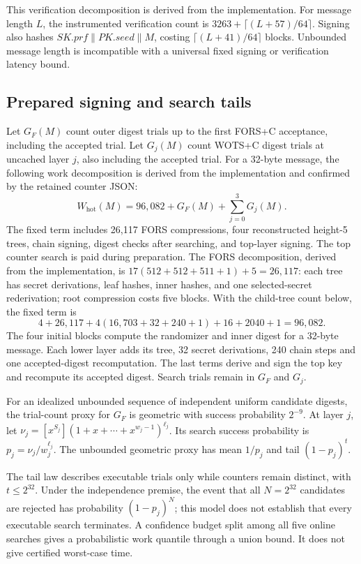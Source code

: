 \documentclass[a4paper,envcountsame,runningheads]{llncs}
\begin{document}
This verification decomposition is derived from the implementation. For message length $L$, the instrumented verification count is $3263+\lceil(L+57)/64\rceil$. Signing also hashes $SK.prf\|PK.seed\|M$, costing $\lceil(L+41)/64\rceil$ blocks. Unbounded message length is incompatible with a universal fixed signing or verification latency bound.

\subsection{Prepared signing and search tails}
Let $G_F(M)$ count outer digest trials up to the first FORS+C acceptance, including the accepted trial. Let $G_j(M)$ count WOTS+C digest trials at uncached layer $j$, also including the accepted trial. For a 32-byte message, the following work decomposition is derived from the implementation and confirmed by the retained counter JSON:
\begin{equation}\label{eq:signwork}
 W_{\mathrm{hot}}(M)=96{,}082+G_F(M)+\sum_{j=0}^{3}G_j(M).
\end{equation}
The fixed term includes 26,117 FORS compressions, four reconstructed height-5 trees, chain signing, digest checks after searching, and top-layer signing. The top counter search is paid during preparation. The FORS decomposition, derived from the implementation, is $17(512+512+511+1)+5=26{,}117$: each tree has secret derivations, leaf hashes, inner hashes, and one selected-secret rederivation; root compression costs five blocks. With the child-tree count below, the fixed term is
\[
 4+26{,}117+4(16{,}703+32+240+1)+16+2040+1=96{,}082.
\]
The four initial blocks compute the randomizer and inner digest for a 32-byte message. Each lower layer adds its tree, 32 secret derivations, 240 chain steps and one accepted-digest recomputation. The last terms derive and sign the top key and recompute its accepted digest. Search trials remain in $G_F$ and $G_j$.

For an idealized unbounded sequence of independent uniform candidate digests, the trial-count proxy for $G_F$ is geometric with success probability $2^{-9}$. At layer $j$, let $\nu_j=[x^{S_j}](1+x+\cdots+x^{w_j-1})^{\ell_j}$. Its search success probability is $p_j=\nu_j/w_j^{\ell_j}$. The unbounded geometric proxy has mean $1/p_j$ and tail $(1-p_j)^t$.

The tail law describes executable trials only while counters remain distinct, with $t\le 2^{32}$. Under the independence premise, the event that all $N=2^{32}$ candidates are rejected has probability $(1-p_j)^N$; this model does not establish that every executable search terminates. A confidence budget split among all five online searches gives a probabilistic work quantile through a union bound. It does not give certified worst-case time.
\end{document}
